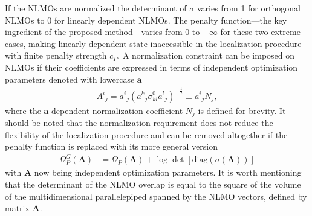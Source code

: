 \documentclass[aps,prl,reprint,amsmath,amssymb]{revtex4-1}
\newcommand{\braket}[2]{\ensuremath{\langle #1 \vert #2 \rangle}} %
\begin{document}
If the NLMOs are normalized the determinant of $\sigma$ varies from 1 for orthogonal NLMOs to 0 for linearly dependent NLMOs. The penalty function---the key ingredient of the proposed method---varies from 0 to $+\infty$ for these two extreme cases, making linearly dependent state inaccessible in the localization procedure with finite penalty strength $c_P$. 
A normalization constraint can be imposed on NLMOs if their coefficients are expressed in terms of independent optimization parameters denoted with lowercase $\mathbf{a}$
%
\begin{equation}
\begin{split}
{A^i}_j = {a^i}_{j} ({a^k}_{j} \sigma^0_{kl}{a^l}_{j})^{-\frac{1}{2}} \equiv {a^i}_{j} N_j ,
\end{split}
\end{equation}
%
where the $\mathbf{a}$-dependent normalization coefficient $N_j$ is defined for brevity. 
%
It should be noted that the normalization requirement does not reduce the flexibility of the localization procedure and can be removed altogether if the penalty function is replaced with its more general version
%
\begin{equation} 
\begin{split}
\Omega_{P}^{G}(\mathbf{A}) 
 &= \Omega_{P}(\mathbf{A}) + \log \det \left[ \text{diag}(\sigma(\mathbf{A}))\right]
\end{split}
\end{equation}
%
with $\mathbf{A}$ now being independent optimization parameters.
%
%
It is worth mentioning that the determinant of the NLMO overlap is equal to the square of the volume of the multidimensional parallelepiped spanned by the NLMO vectors, defined by matrix $\mathbf{A}$. 
\end{document}
